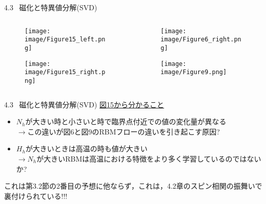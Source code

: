 \documentclass[dvipdfmx,8pt]{beamer}
\begin{document}
\begin{frame}[t]{4.3 \ 磁化と特異値分解(SVD)}
  \begin{columns}
    \begin{column}{0.5\textwidth}
      \begin{figure}
        \begin{center}
          \texttt{[image: image/Figure15\_left.png]}
        \end{center}
      \end{figure}
      \begin{figure}
        \begin{center}
          \texttt{[image: image/Figure15\_right.png]}
        \end{center}
      \end{figure}
    \end{column}
    \begin{column}{0.5\textwidth}
      \begin{figure}
        \begin{center}
          \texttt{[image: image/Figure6\_right.png]}
        \end{center}
      \end{figure}
      \begin{figure}
        \begin{center}
          \texttt{[image: image/Figure9.png]}
        \end{center}
      \end{figure}
    \end{column}
  \end{columns}
\end{frame}

\begin{frame}[t]{4.3 \ 磁化と特異値分解(SVD)}
  \underline{図15から分かること}
  \vspace{0.2cm}
  \begin{itemize}
    \item $N_h$が大きい時と小さいと時で臨界点付近での値の変化量が異なる\\
          \vspace{0.2cm}
          $\rightarrow$この違いが図6と図9のRBMフローの違いを引き起こす原因?
    \item $H_h$が大きいときは高温の時も値が大きい\\
          \vspace{0.2cm}
          $\rightarrow$$N_h$が大きいRBMは高温における特徴をより多く学習しているのではないか?
  \end{itemize}
  \vspace{0.2cm}
  これは第3.2節の2番目の予想に他ならず，これは，4.2章のスピン相関の振舞いで裏付けられている!!!
\end{frame}
\end{document}
